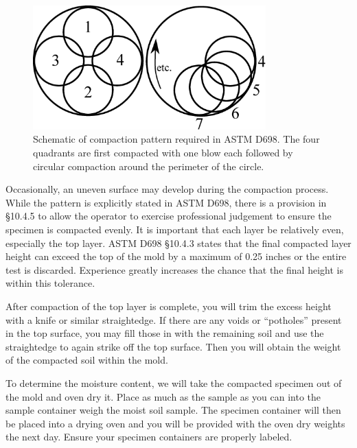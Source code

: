 \documentclass[12pt]{article}
\begin{document}
\begin{figure}
    \centering
    \includegraphics[width=0.8\textwidth]{compactionpattern.eps}
    \caption{Schematic of compaction pattern required in ASTM D698. The four quadrants are first compacted with one blow each followed by circular compaction around the perimeter of the circle.}
    \label{fig:compactionpattern}
\end{figure}

Occasionally, an uneven surface may develop during the compaction process. While the pattern is explicitly stated in ASTM D698, there is a provision in \S10.4.5 to allow the operator to exercise professional judgement to ensure the specimen is compacted evenly. It is important that each layer be relatively even, especially the top layer. ASTM D698 \S10.4.3 states that the final compacted layer height can exceed the top of the mold by a maximum of 0.25 inches or the entire test is discarded. Experience greatly increases the chance that the final height is within this tolerance.

After compaction of the top layer is complete, you will trim the excess height with a knife or similar straightedge. If there are any voids or ``potholes'' present in the top surface, you may fill those in with the remaining soil and use the straightedge to again strike off the top surface. Then you will obtain the weight of the compacted soil within the mold.

To determine the moisture content, we will take the compacted specimen out of the mold and oven dry it. Place as much as the sample as you can into the sample container weigh the moist soil sample. The specimen container will then be placed into a drying oven and you will be provided with the oven dry weights the next day. Ensure your specimen containers are properly labeled.
\end{document}
